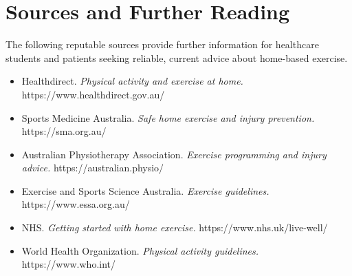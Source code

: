 \section*{Sources and Further Reading}
The following reputable sources provide further information for healthcare students and patients seeking reliable, current advice about home-based exercise.

\begin{itemize}
    \item Healthdirect. \textit{Physical activity and exercise at home.} https://www.healthdirect.gov.au/
    \item Sports Medicine Australia. \textit{Safe home exercise and injury prevention.} https://sma.org.au/
    \item Australian Physiotherapy Association. \textit{Exercise programming and injury advice.} https://australian.physio/
    \item Exercise and Sports Science Australia. \textit{Exercise guidelines.} https://www.essa.org.au/
    \item NHS. \textit{Getting started with home exercise.} https://www.nhs.uk/live-well/
    \item World Health Organization. \textit{Physical activity guidelines.} https://www.who.int/
\end{itemize}
